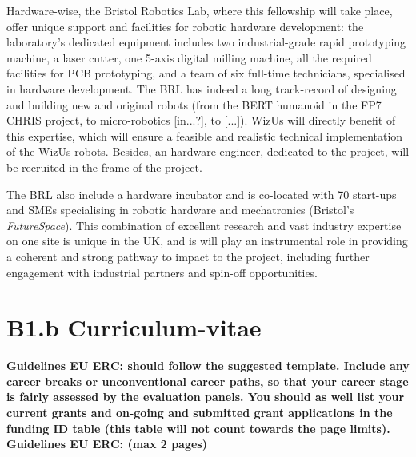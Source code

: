 \documentclass[11pt]{report}
\newcommand{\project}{WizUs\xspace}
\newcommand{\eu}[1]{{\color{teal}\textbf{Guidelines EU ERC: #1}}}
\begin{document}
Hardware-wise, the Bristol Robotics Lab, where this fellowship will take place,
offer unique support and facilities for robotic hardware development: the
laboratory's dedicated equipment includes two industrial-grade rapid prototyping
machine, a laser cutter, one 5-axis digital milling machine, all the required
facilities for PCB prototyping, and a team of six full-time technicians,
specialised in hardware development. The BRL has indeed a long track-record of
designing and building new and original robots (from the BERT humanoid in the
FP7 CHRIS project, to micro-robotics [in...?], to [...]). \project will directly
benefit of this expertise, which will ensure a feasible and realistic technical
implementation of the \project robots. Besides, an hardware engineer, dedicated
to the project, will be recruited in the frame of the project.

The BRL also include a hardware incubator and is co-located with 70 start-ups
and SMEs specialising in robotic hardware and mechatronics (Bristol's
\emph{FutureSpace}). This combination of excellent research and vast industry
expertise on one site is unique in the UK, and is will play an instrumental role
in providing a coherent and strong pathway to impact to the project, including
further engagement with industrial partners and spin-off opportunities.



\newpage

\printbibliography





\newpage

\chapter{B1.b Curriculum-vitae}\label{the-principal-investigator}

\eu{should follow the suggested template. Include any career
breaks or unconventional career paths, so that your career stage is fairly assessed by the evaluation
panels. You should as well list your current grants and on-going and submitted grant applications in
the funding ID table (this table will not count towards the page limits).}
\eu{(max 2 pages)}

\newpage
\end{document}
